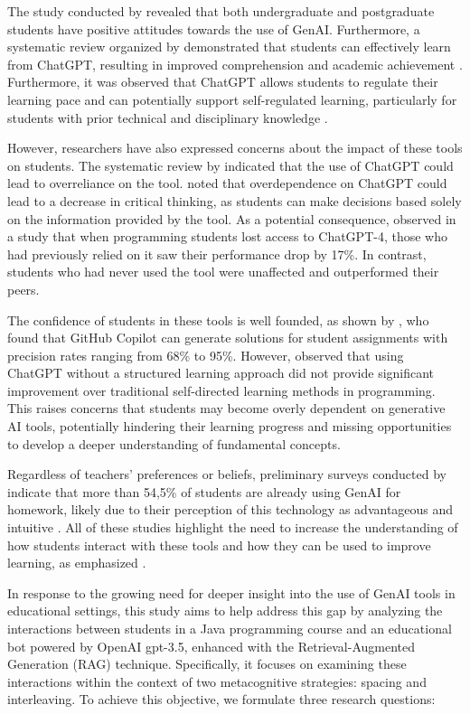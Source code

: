 \documentclass[a4paper,twoside]{article}
\begin{document}
The study conducted by \cite{chan23} revealed that both undergraduate and
postgraduate students have positive attitudes towards the use of GenAI.
Furthermore, a systematic review organized by \cite{Lo24} demonstrated that
students can effectively learn from ChatGPT, resulting in improved comprehension
and academic achievement \citep{Callejo24}. Furthermore, it was observed that
ChatGPT allows students to regulate their learning pace \citep{Baha24} and can
potentially support self-regulated learning, particularly for students with
prior technical and disciplinary knowledge \citep{Xia23}.

However, researchers have also expressed concerns about the impact of these
tools on students. The systematic review by \cite{Murillo23} indicated that the
use of ChatGPT could lead to overreliance on the tool. \cite{chan23} noted that
overdependence on ChatGPT could lead to a decrease in critical thinking, as
students can make decisions based solely on the information provided by the tool.
As a potential consequence, \cite{Bastani24} observed in a study that when
programming students lost access to ChatGPT-4, those who had previously relied
on it saw their performance drop by 17\%. In contrast, students who had never
used the tool were unaffected and outperformed their peers.

The confidence of students in these tools is well founded, as shown by
\cite{Puryear22}, who found that GitHub Copilot can generate solutions for
student assignments with precision rates ranging from 68\% to 95\%. However,
\cite{Boudouaia24} observed that using ChatGPT without a structured learning
approach did not provide significant improvement over traditional self-directed
learning methods in programming. This raises concerns that students may become
overly dependent on generative AI tools, potentially hindering their learning
progress and missing opportunities to develop a deeper understanding of
fundamental concepts.

Regardless of teachers' preferences or beliefs, preliminary surveys conducted
by \cite{Dickey24} indicate that more than 54,5\% of students are already using
GenAI for homework, likely due to their perception of this technology as
advantageous and intuitive \citep{Boudouaia24}. All of these studies highlight
the need to increase the understanding of how students interact with these tools
and how they can be used to improve learning, as emphasized \cite{Lo24}.

In response to the growing need for deeper insight into the use of GenAI tools
in educational settings, this study aims to help address this gap by analyzing
the interactions between students in a Java programming course and an
educational bot powered by OpenAI gpt-3.5, enhanced with the
Retrieval-Augmented Generation (RAG) technique. Specifically, it focuses on
examining these interactions within the context of two metacognitive strategies:
spacing and interleaving. To achieve this objective, we formulate three research
questions:
\end{document}
